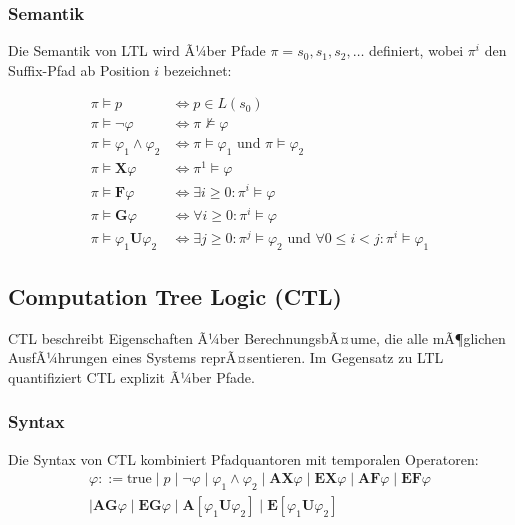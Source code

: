 ﻿\documentclass[a4paper,12pt]{article}
\theoremstyle{definition}
\begin{document}
\subsubsection{Semantik}

Die Semantik von LTL wird Ã¼ber Pfade $\pi = s_0, s_1, s_2, \ldots$ definiert, wobei $\pi^i$ den Suffix-Pfad ab Position $i$ bezeichnet:

\begin{align}
\pi \models p &\iff p \in L(s_0) \\
\pi \models \neg\varphi &\iff \pi \not\models \varphi \\
\pi \models \varphi_1 \land \varphi_2 &\iff \pi \models \varphi_1 \text{ und } \pi \models \varphi_2 \\
\pi \models \mathbf{X}\varphi &\iff \pi^1 \models \varphi \\
\pi \models \mathbf{F}\varphi &\iff \exists i \geq 0: \pi^i \models \varphi \\
\pi \models \mathbf{G}\varphi &\iff \forall i \geq 0: \pi^i \models \varphi \\
\pi \models \varphi_1 \mathbf{U} \varphi_2 &\iff \exists j \geq 0: \pi^j \models \varphi_2 \text{ und } \forall 0 \leq i < j: \pi^i \models \varphi_1
\end{align}

\subsection{Computation Tree Logic (CTL)}

CTL beschreibt Eigenschaften Ã¼ber BerechnungsbÃ¤ume, die alle mÃ¶glichen AusfÃ¼hrungen eines Systems reprÃ¤sentieren. Im Gegensatz zu LTL quantifiziert CTL explizit Ã¼ber Pfade.

\subsubsection{Syntax}

Die Syntax von CTL kombiniert Pfadquantoren mit temporalen Operatoren:
\begin{multline}
\varphi ::= \text{true} \mid p \mid \neg \varphi \mid \varphi_1 \land \varphi_2
  \mid \mathbf{AX}\varphi \mid \mathbf{EX}\varphi \mid \mathbf{AF}\varphi \mid \mathbf{EF}\varphi \\
  \mid \mathbf{AG}\varphi \mid \mathbf{EG}\varphi
  \mid \mathbf{A}[\varphi_1 \mathbf{U} \varphi_2] \mid \mathbf{E}[\varphi_1 \mathbf{U} \varphi_2]
\end{multline}
\end{document}
